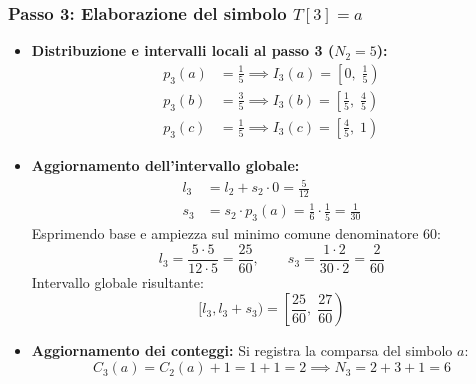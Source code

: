 \subsubsection*{Passo 3: Elaborazione del simbolo $T[3] = a$}
\begin{itemize}
  \item \textbf{Distribuzione e intervalli locali al passo 3 ($N_2 = 5$):}
  \begin{align}
    p_3(a) &= \frac{1}{5} \implies I_3(a) = \left[ 0, \; \frac{1}{5} \right) \\
    p_3(b) &= \frac{3}{5} \implies I_3(b) = \left[ \frac{1}{5}, \; \frac{4}{5} \right) \\
    p_3(c) &= \frac{1}{5} \implies I_3(c) = \left[ \frac{4}{5}, \; 1 \right)
  \end{align}
  \item \textbf{Aggiornamento dell'intervallo globale:}
  \begin{align}
    l_3 &= l_2 + s_2 \cdot 0 = \frac{5}{12} \\
    s_3 &= s_2 \cdot p_3(a) = \frac{1}{6} \cdot \frac{1}{5} = \frac{1}{30}
  \end{align}
  Esprimendo base e ampiezza sul minimo comune denominatore $60$:
  \begin{equation}
    l_3 = \frac{5 \cdot 5}{12 \cdot 5} = \frac{25}{60}, \qquad s_3 = \frac{1 \cdot 2}{30 \cdot 2} = \frac{2}{60}
  \end{equation}
  Intervallo globale risultante:
  \begin{equation}
    [l_3, l_3 + s_3) = \left[ \frac{25}{60}, \; \frac{27}{60} \right)
  \end{equation}
  \item \textbf{Aggiornamento dei conteggi:} Si registra la comparsa del simbolo $a$:
  \begin{equation}
    C_3(a) = C_2(a) + 1 = 1 + 1 = 2 \implies N_3 = 2 + 3 + 1 = 6
  \end{equation}
\end{itemize}

